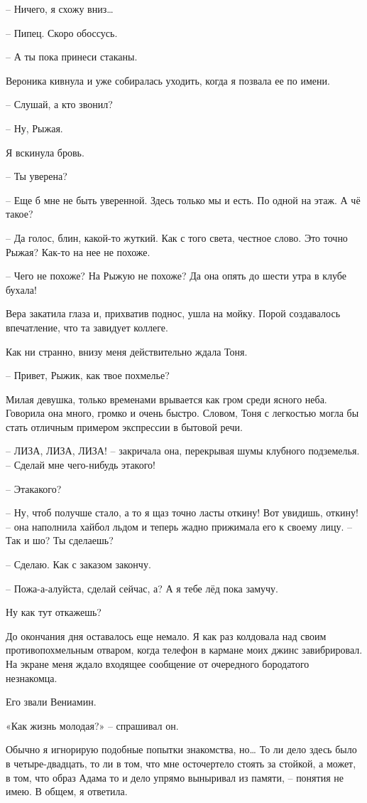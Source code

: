 \documentclass[
]{book}
\begin{document}
-- Ничего, я схожу вниз\ldots{}

-- Пипец. Скоро обоссусь.

-- А ты пока принеси стаканы.

Вероника кивнула и уже собиралась уходить, когда я позвала ее по имени.

-- Слушай, а кто звонил?

-- Ну, Рыжая.

Я вскинула бровь.

-- Ты уверена?

-- Еще б мне не быть уверенной. Здесь только мы и есть. По одной на этаж. А чё такое?

-- Да голос, блин, какой-то жуткий. Как с того света, честное слово. Это точно Рыжая? Как-то на нее не похоже.

-- Чего не похоже? На Рыжую не похоже? Да она опять до шести утра в клубе бухала!

Вера закатила глаза и, прихватив поднос, ушла на мойку. Порой создавалось впечатление, что та завидует коллеге.

Как ни странно, внизу меня действительно ждала Тоня.

-- Привет, Рыжик, как твое похмелье?

Милая девушка, только временами врывается как гром среди ясного неба. Говорила она много, громко и очень быстро. Словом, Тоня с легкостью могла бы стать отличным примером экспрессии в бытовой речи.

-- ЛИЗА, ЛИЗА, ЛИЗА! -- закричала она, перекрывая шумы клубного подземелья. -- Сделай мне чего-нибудь этакого!

-- Этакакого?

-- Ну, чтоб получше стало, а то я щаз точно ласты откину! Вот увидишь, откину! -- она наполнила хайбол льдом и теперь жадно прижимала его к своему лицу. -- Так и шо? Ты сделаешь?

-- Сделаю. Как с заказом закончу.

-- Пожа-а-алуйста, сделай сейчас, а? А я тебе лёд пока замучу.

Ну как тут откажешь?

До окончания дня оставалось еще немало. Я как раз колдовала над своим противопохмельным отваром, когда телефон в кармане моих джинс завибрировал. На экране меня ждало входящее сообщение от очередного бородатого незнакомца.

Его звали Вениамин.

«Как жизнь молодая?» -- спрашивал он.

Обычно я игнорирую подобные попытки знакомства, но\ldots{} То ли дело здесь было в четыре-двадцать, то ли в том, что мне осточертело стоять за стойкой, а может, в том, что образ Адама то и дело упрямо выныривал из памяти, -- понятия не имею. В общем, я ответила.
\end{document}
